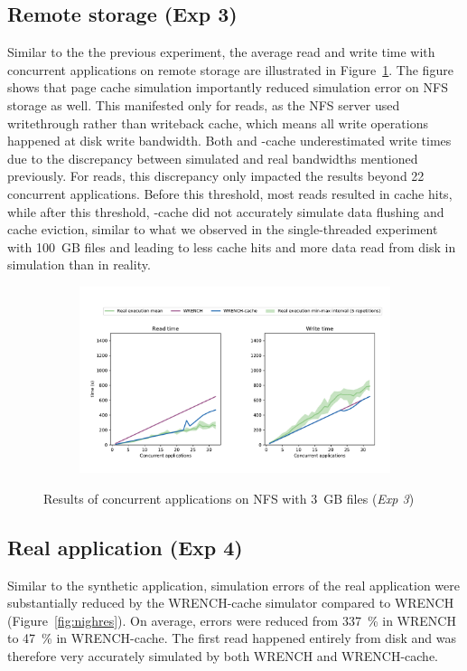 \subsection{Remote storage (Exp 3)}

Similar to the the previous experiment, the average read and write time 
with concurrent applications on remote storage are illustrated 
in Figure~\ref{fig:multi_nfs}.
The figure shows that page cache simulation importantly reduced 
simulation error on NFS storage as well. 
This manifested only for reads, as the NFS server used writethrough rather 
than writeback cache, which means all write operations happened at disk 
write bandwidth. 
Both \wrench and \wrench-cache
underestimated write times due to the discrepancy between
simulated and real bandwidths mentioned previously. 
For reads, this discrepancy only impacted the results beyond 22
concurrent applications. Before this threshold, most reads resulted in 
cache hits, while after this threshold, \wrench-cache did not accurately 
simulate data flushing and cache eviction, similar to what we observed in 
the single-threaded experiment with 100~GB files and leading to 
less cache hits and more data read from disk in simulation than in reality. 

\begin{figure}[!h]
    \begin{subfigure}{\linewidth}
        \centering
        \includegraphics[width=\linewidth]{result/multi/figures/multi_nfs.pdf}
    \end{subfigure}
    \caption{Results of concurrent applications on NFS with 3~GB files 
    (\textit{Exp 3})}
    \label{fig:multi_nfs}
\end{figure}

\subsection{Real application (Exp 4)}
Similar to the synthetic application, simulation errors of the real 
application were substantially reduced by the WRENCH-cache simulator 
compared to WRENCH (Figure~\ref{fig:nighres}). 
On average, errors were reduced from 337~\% in WRENCH to 47~\% in 
WRENCH-cache. 
The first read happened entirely from disk and was therefore 
very accurately simulated by both WRENCH and WRENCH-cache.

